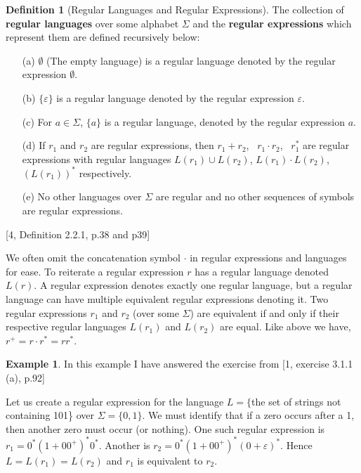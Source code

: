 \documentclass[a4paper,12pt]{report}
\theoremstyle{definition}
\newtheorem{definition}{Definition}[subsection]
\newtheorem{exmp}{Example}[subsection]
\begin{document}
\begin{definition}[Regular Languages and Regular Expressions]
\label{RegLangDef}
The collection of \textbf{regular languages} over some alphabet $\Sigma$ and the \textbf{regular expressions} which represent them are defined recursively below:
\begin{itemize}
    \item [(a)]$\emptyset$ (The empty language) is a regular language denoted by the regular expression $\emptyset$.
    \item [(b)]$\{\varepsilon\}$ is a regular language denoted by the regular expression  $\varepsilon$.
    \item [(c)]For $a\in\Sigma$, $\{a\}$ is a regular language, denoted by the regular expression $a$.
    \item [(d)] If $r_1$ and $r_2$ are regular expressions, then  $r_1+r_2$, \ $r_1\cdot r_2$, \ $r_1^*$ are regular expressions with regular languages $L(r_1)\cup L(r_2)$, $L(r_1)\cdot L(r_2)$, $(L(r_1))^*$ respectively.
    \item[(e)] No other languages over $\Sigma$ are regular and no other sequences of symbols are regular expressions. 
\end{itemize}
[4, Definition 2.2.1, p.38 and p39]
\end{definition}  

\noindent We often omit the concatenation symbol $\cdot$ in regular expressions and languages for ease. To reiterate a regular expression $r$ has a regular language denoted $L(r)$. 
A regular expression denotes exactly one regular language, but a regular language can have multiple equivalent regular expressions denoting it.
Two regular expressions $r_1$ and $r_2$ (over some $\Sigma$) are equivalent if and only if their respective regular languages $L(r_1)$ and $L(r_2)$ are equal. Like above we have, $r^+=r\cdot r^*=rr^*$.
\begin{exmp}
In this example I have answered the exercise from [1, exercise 3.1.1 (a), p.92]

Let us create a regular expression for the language $L=\{$the set of strings not containing 101\} over $\Sigma=\{0,1\}$.
We must identify that if a zero occurs after a 1, then another zero must occur (or nothing). One such regular expression is $r_1=0^*(1+00^+)^*0^*$. Another is $r_2=0^*(1+00^+)^*(0+\varepsilon)^*$. Hence
$L=L(r_1)=L(r_2)$ and $r_1$ is equivalent to $r_2$.
\end{exmp}
\end{document}
